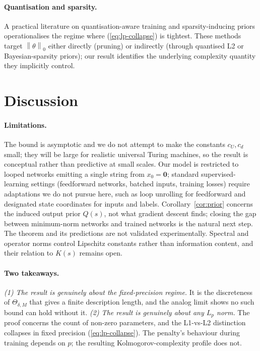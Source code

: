 \documentclass{article}
\theoremstyle{definition}
\newcommand{\norm}[1]{\left\lVert#1\right\rVert}
\newcommand{\Param}{\Theta}
\begin{document}
\paragraph{Quantisation and sparsity.}
A practical literature on quantisation-aware training
\citep{hubara2017quantized,han2016deep} and sparsity-inducing priors
\citep{molchanov2017variational,frankle2019lottery,hoefler2021sparsity}
operationalises the regime where (\ref{eq:lp-collapse}) is tightest. These
methods target $\norm{\theta}_0$ either directly (pruning) or indirectly
(through quantised L2 or Bayesian-sparsity priors); our result identifies the
underlying complexity quantity they implicitly control.

\section{Discussion}\label{sec:discussion}

\paragraph{Limitations.}
The bound is asymptotic and we do not attempt to make the constants $c_U, c_d$
small; they will be large for realistic universal Turing machines, so the
result is conceptual rather than predictive at small scales. Our model is
restricted to looped networks emitting a single string from $x_0 = \mathbf{0}$;
standard supervised-learning settings (feedforward networks, batched inputs,
training losses) require adaptations we do not pursue here, such as loop
unrolling for feedforward and designated state coordinates for inputs and
labels. Corollary~\ref{cor:prior} concerns the induced output prior $Q(s)$, not
what gradient descent finds; closing the gap between minimum-norm networks and
trained networks is the natural next step. The theorem and its predictions are
not validated experimentally. Spectral and operator norms control Lipschitz
constants rather than information content, and their relation to $K(s)$ remains
open.

\paragraph{Two takeaways.} \emph{(1) The result is genuinely about the fixed-precision regime.} It is the discreteness of $\Param_{\delta, M}$ that gives a finite description length, and the analog limit \citep{siegelmann1995computational} shows no such bound can hold without it. \emph{(2) The result is genuinely about any $L_p$ norm.} The proof concerns the count of non-zero parameters, and the L1-vs-L2 distinction collapses in fixed precision (\ref{eq:lp-collapse}). The penalty's behaviour during training depends on $p$; the resulting Kolmogorov-complexity profile does not.
\end{document}

